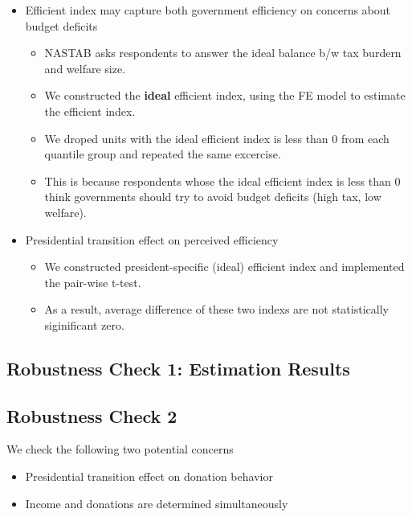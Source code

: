 \documentclass[ review  , 3p ]{elsarticle}
\providecommand{\tightlist}{%
  \setlength{\itemsep}{0pt}\setlength{\parskip}{0pt}}
\begin{document}
  \begin{itemize}
  \tightlist
  \item
    Efficient index may capture both government efficiency on concerns about budget deficits
  
    \begin{itemize}
    \tightlist
    \item
      NASTAB asks respondents to answer the ideal balance b/w tax burdern and welfare size.
    \item
      We constructed the \textbf{ideal} efficient index, using the FE model to estimate the efficient index.
    \item
      We droped units with the ideal efficient index is less than 0 from each quantile group and repeated the same excercise.
    \item
      This is because respondents whose the ideal efficient index is less than 0 think governments should try to avoid budget deficits (high tax, low welfare).
    \end{itemize}
  \item
    Presidential transition effect on perceived efficiency
  
    \begin{itemize}
    \tightlist
    \item
      We constructed president-specific (ideal) efficient index and implemented the pair-wise t-test.
    \item
      As a result, average difference of these two indexs are not statistically siginificant zero.
    \end{itemize}
  \end{itemize}
  
  \hypertarget{robustness-check-1-estimation-results}{%
  \subsection{Robustness Check 1: Estimation Results}\label{robustness-check-1-estimation-results}}
  
  \hypertarget{robustness-check-2-1}{%
  \subsection{Robustness Check 2}\label{robustness-check-2-1}}
  
  We check the following two potential concerns
  
  \begin{itemize}
  \tightlist
  \item
    Presidential transition effect on donation behavior
  \item
    Income and donations are determined simultaneously
  \end{itemize}
  
\end{document}
